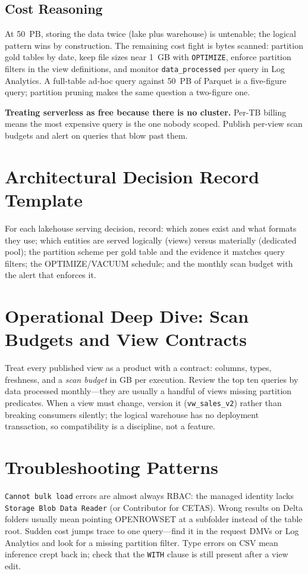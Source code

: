 \subsection{Cost Reasoning}
At 50~PB, storing the data twice (lake plus warehouse) is untenable; the logical pattern wins by construction. The remaining cost fight is bytes scanned: partition gold tables by date, keep file sizes near 1~GB with \texttt{OPTIMIZE}, enforce partition filters in the view definitions, and monitor \texttt{data\_processed} per query in Log Analytics. A full-table ad-hoc query against 50~PB of Parquet is a five-figure query; partition pruning makes the same question a two-figure one.

\begin{pitfall}
\textbf{Treating serverless as free because there is no cluster.} Per-TB billing means the most expensive query is the one nobody scoped. Publish per-view scan budgets and alert on queries that blow past them.
\end{pitfall}

\section{Architectural Decision Record Template}
For each lakehouse serving decision, record: which zones exist and what formats they use; which entities are served logically (views) versus materially (dedicated pool); the partition scheme per gold table and the evidence it matches query filters; the OPTIMIZE/VACUUM schedule; and the monthly scan budget with the alert that enforces it.

\section{Operational Deep Dive: Scan Budgets and View Contracts}
Treat every published view as a product with a contract: columns, types, freshness, and a \emph{scan budget} in GB per execution. Review the top ten queries by data processed monthly---they are usually a handful of views missing partition predicates. When a view must change, version it (\texttt{vw\_sales\_v2}) rather than breaking consumers silently; the logical warehouse has no deployment transaction, so compatibility is a discipline, not a feature.

\section{Troubleshooting Patterns}
\texttt{Cannot bulk load} errors are almost always RBAC: the managed identity lacks \texttt{Storage Blob Data Reader} (or Contributor for CETAS). Wrong results on Delta folders usually mean pointing OPENROWSET at a subfolder instead of the table root. Sudden cost jumps trace to one query---find it in the request DMVs or Log Analytics and look for a missing partition filter. Type errors on CSV mean inference crept back in; check that the \texttt{WITH} clause is still present after a view edit.

